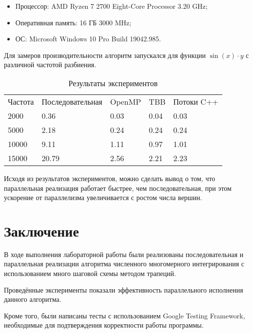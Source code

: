 \documentclass{report}
\begin{document}
\begin{itemize}
\item Процессор: AMD Ryzen 7 2700 Eight-Core Processor 3.20 GHz;
\item Оперативная память: 16 ГБ 3000 MHz;
\item ОС: Microsoft Windows 10 Pro Build 19042.985.
\end{itemize}

\par Для замеров производительности алгоритм запускался для функции $\sin(x)\cdot y$ с различной частотой разбиения.

\begin{table}[!h]
\caption{Результаты экспериментов}
\centering
\begin{tabular}{lllll}
Частота & Последовательная & OpenMP & TBB & Потоки C++ \\
2000    & 0.36                    & 0.03       & 0.04          & 0.03    \\
5000    & 2.18                    & 0.24       & 0.24          & 0.24    \\
10000   & 9.11                    & 1.11       & 0.97          & 1.01    \\
15000   & 20.79                   & 2.56       & 2.21          & 2.23    \\
\end{tabular}
\end{table}

\par Исходя из результатов экспериментов, можно сделать вывод о том, что параллельная реализация работает быстрее, чем последовательная, при этом ускорение от параллелизма увеличивается с ростом числа вершин.
\newpage

\section*{Заключение}
В ходе выполнения лабораторной работы были реализованы последовательная и параллельная реализации алгоритма численного многомерного интегрирования с использованием много шаговой схемы методом трапеций.
\par Проведённые эксперименты показали эффективность параллельного исполнения данного алгоритма.
\par Кроме того, были написаны тесты с использованием Google Testing Framework, необходимые для подтверждения корректности работы программы.
\newpage
\end{document}
